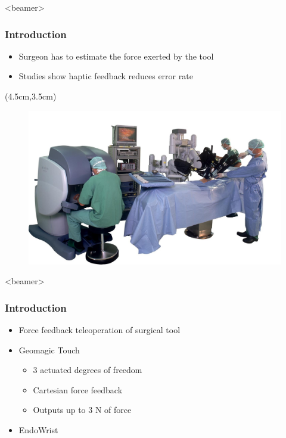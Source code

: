 \begin{frame}<beamer>
\frametitle{Introduction}
\begin{itemize}
\item Surgeon has to estimate the force exerted by the tool
\item Studies show haptic feedback reduces error rate
\end{itemize}

\begin{textblock*}{0.7\textwidth}(4.5cm,3.5cm) %
  \begin{figure}[H]
  	\centering
  		\centering
  		\includegraphics[width=1\textwidth]{Billeder/Dan/davinci.jpg}
  \end{figure}
\end{textblock*}

\end{frame}

\begin{frame}<beamer>
\frametitle{Introduction}
\begin{itemize}
\item Force feedback teleoperation of surgical tool
\item Geomagic Touch 
\begin{itemize}
\item 3 actuated degrees of freedom 
\item Cartesian force feedback
\item Outputs up to 3 N of force
\end{itemize}
\item EndoWrist
\end{itemize}
\end{frame}


